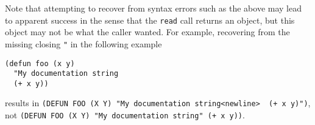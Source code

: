 Note that attempting to recover from syntax errors such as the above
may lead to apparent success in the sense that the \texttt{read} call
returns an object, but this object may not be what the caller
wanted. For example, recovering from the missing closing \texttt{"} in
the following example

\begin{Verbatim}[frame=single]
(defun foo (x y)
  "My documentation string
  (+ x y))
\end{Verbatim}

results in \verb!(DEFUN FOO (X Y) "My documentation string<newline>  (+ x y)")!,
not \verb!(DEFUN FOO (X Y) "My documentation string" (+ x y))!.